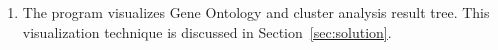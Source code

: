 \begin{enumerate}

\item The program visualizes Gene Ontology and cluster analysis result tree. This visualization technique is discussed in Section~\ref{sec:solution}.

\begin{figure}[h!]
\centering
{}
\end{figure}
\end{enumerate}
